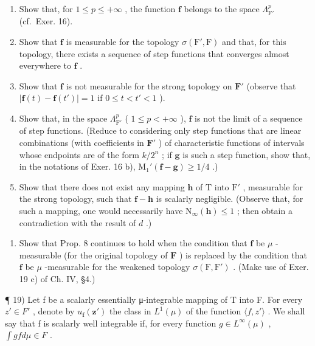\begin{enumerate}
\def\labelenumi{\alph{enumi})}
\item
  Show that, for \(1 \leqslant p \leqslant +\infty\) , the function \(\mathbf{f}\) belongs to the space \(\Lambda_{\mathrm{F}'}^p\) (cf.~Exer. 16).
\item
  Show that \(\mathbf{f}\) is measurable for the topology \(\sigma(\mathrm{F}',\mathrm{F})\) and that, for this topology, there exists a sequence of step functions that converges almost everywhere to \(\mathbf{f}\) .
\item
  Show that \(\mathbf{f}\) is not measurable for the strong topology on \(\mathbf{F}'\) (observe that \(|\mathbf{f}(t) - \mathbf{f}(t')| = 1\) if \(0 \leqslant t < t' < 1\) ).
\item
  Show that, in the space \(\Lambda_{\mathrm{F}'}^p\) ( \(1 \leqslant p < +\infty\) ), \(\mathbf{f}\) is not the limit of a sequence of step functions. (Reduce to considering only step functions that are linear combinations (with coefficients in \(\mathbf{F}'\) ) of characteristic functions of intervals whose endpoints are of the form \(k/2^n\) ; if \(\mathbf{g}\) is such a step function, show that, in the notations of Exer. 16 b), \(\mathrm{M}_1'(\mathbf{f} - \mathbf{g}) \geqslant 1/4\) .)
\item
  Show that there does not exist any mapping \(\mathbf{h}\) of \(\mathrm{T}\) into \(\mathrm{F}'\) , measurable for the strong topology, such that \(\mathbf{f} - \mathbf{h}\) is scalarly negligible. (Observe that, for such a mapping, one would necessarily have \(\mathrm{N}_{\infty}(\mathbf{h}) \leqslant 1\) ; then obtain a contradiction with the result of \(d\) .)
\end{enumerate}

\begin{enumerate}
\def\labelenumi{\arabic{enumi})}
\setcounter{enumi}{17}
\tightlist
\item
  Show that Prop. 8 continues to hold when the condition that \(\mathbf{f}\) be \(\mu\) -measurable (for the original topology of \(\mathbf{F}\) ) is replaced by the condition that \(\mathbf{f}\) be \(\mu\) -measurable for the weakened topology \(\sigma(\mathrm{F},\mathrm{F}')\) . (Make use of Exer. 19 c) of Ch. IV, §4.)
\end{enumerate}

¶ 19) Let f be a scalarly essentially μ-integrable mapping of T into F. For every \(z' \in F'\) , denote by \(u_{\mathbf{f}}(\mathbf{z}')\) the class in \(L^{1}(\mu)\) of the function \(\langle f, z' \rangle\) . We shall say that f is scalarly well integrable if, for every function \(g \in L^{\infty}(\mu)\) , \(\int g f d\mu \in F\) .

